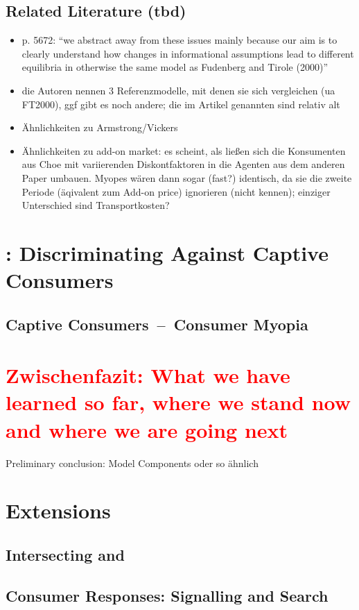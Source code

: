\documentclass[a4paper, 11 pt, fleqn]{article}
\begin{document}
\subsection{Related Literature (tbd)}
\begin{itemize}
	\item p. 5672: ``we abstract away from these issues mainly because our aim is to clearly understand how changes in informational assumptions lead to different equilibria
	in otherwise the same model as Fudenberg and Tirole (2000)''
	\item die Autoren nennen 3 Referenzmodelle, mit denen sie sich vergleichen (ua FT2000), ggf gibt es noch andere; die im Artikel genannten sind relativ alt
	\item Ähnlichkeiten zu Armstrong/Vickers
	\item Ähnlichkeiten zu add-on market: es scheint, als ließen sich die Konsumenten aus Choe mit variierenden Diskontfaktoren in die Agenten aus dem anderen Paper umbauen. Myopes wären dann sogar (fast?) identisch, da sie die zweite Periode (äqivalent zum Add-on price) ignorieren (nicht kennen); einziger Unterschied sind Transportkosten?
\end{itemize}
%
\section{\citet{Armstrong.2019}: Discriminating Against Captive Consumers}
%
\subsection{Captive Consumers~--~Consumer Myopia}
%
\section{\textcolor{red}{Zwischenfazit: What we have learned so far, where we stand now and where we are going next}}
Preliminary conclusion: Model Components oder so ähnlich
%
\section{Extensions} \label{sec:choe-extensions}
%
\subsection{Intersecting \citet{Choe.2018} and \citet{Armstrong.2019}}
%
\subsection{Consumer Responses: Signalling and Search}
%
\end{document}
